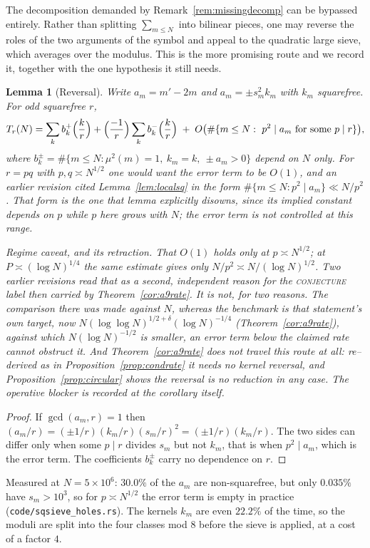 \documentclass[11pt]{article}
\newtheorem{lemma}[theorem]{Lemma}
\theoremstyle{definition}
\begin{document}
The decomposition demanded by Remark~\ref{rem:missingdecomp} can be bypassed entirely. Rather than
splitting $\sum_{m\le N}$ into bilinear pieces, one may reverse the roles of the two arguments of the
symbol and appeal to the quadratic large sieve, which averages over the modulus. This is the more
promising route and we record it, together with the one hypothesis it still needs.

\begin{lemma}[Reversal]\label{lem:reversal}
Write $a_m=m'-2m$ and $a_m=\pm s_m^2k_m$ with $k_m$ squarefree. For odd squarefree $r$,
\[ T_r(N)=\sum_{k}b_k^{+}\Bigl(\frac kr\Bigr)+\Bigl(\frac{-1}r\Bigr)\sum_{k}b_k^{-}\Bigl(\frac kr\Bigr)
   \;+\;O\bigl(\#\{m\le N:\ p^2\mid a_m\ \text{for some }p\mid r\}\bigr), \]
where $b^{\pm}_k=\#\{m\le N:\mu^2(m)=1,\ k_m=k,\ \pm a_m>0\}$ depend on $N$ only. For
$r=pq$ with $p,q\asymp N^{1/2}$ one would want the error term to be $O(1)$, and an earlier revision
cited Lemma~\textup{\ref{lem:localsq}} in the form $\#\{m\le N:p^2\mid a_m\}\ll N/p^2$. That form is
the one that lemma explicitly disowns, since its implied constant depends on $p$ while $p$ here grows
with $N$; the error term is not controlled at this range.

\emph{Regime caveat, and its retraction.} That $O(1)$ holds only at $p\asymp N^{1/2}$; at
$P\asymp(\log N)^{1/4}$ the same estimate gives only $N/p^2\asymp N/(\log N)^{1/2}$. Two earlier
revisions read that as a second, independent reason for the \textsc{conjecture} label then carried by
Theorem~\ref{cor:a9rate}. It is not, for two reasons. The comparison there was made against $N$,
whereas the benchmark is that statement's own target, now
$N(\log\log N)^{1/2+\delta}(\log N)^{-1/4}$ \textup{(}Theorem~\ref{cor:a9rate}\textup{)}, against which
$N(\log N)^{-1/2}$ is \emph{smaller}, an error term below the claimed rate cannot obstruct it.
And Theorem~\ref{cor:a9rate} does not travel this route at all: re--derived as in
Proposition~\ref{prop:condrate} it needs no kernel reversal, and Proposition~\ref{prop:circular}
shows the reversal is no reduction in any case. The operative blocker is recorded at the corollary
itself.
\end{lemma}
\begin{proof}
If $\gcd(a_m,r)=1$ then $(a_m/r)=(\pm1/r)(k_m/r)(s_m/r)^2=(\pm1/r)(k_m/r)$. The two sides can differ
only when some $p\mid r$ divides $s_m$ but not $k_m$, that is when $p^2\mid a_m$, which is the error
term. The coefficients $b^{\pm}_k$ carry no dependence on $r$.
\end{proof}
Measured at $N=5\times10^6$: $30.0\%$ of the $a_m$ are non-squarefree, but only $0.035\%$ have
$s_m>10^3$, so for $p\asymp N^{1/2}$ the error term is empty in practice
\textup{(\texttt{code/sqsieve\_holes.rs})}. The kernels $k_m$ are even $22.2\%$ of the time, so
the moduli are split into the four classes mod $8$ before the sieve is applied, at a cost of a
factor $4$.
\end{document}
